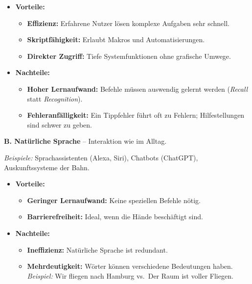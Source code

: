 \documentclass[12pt, a4paper]{article}
\begin{document}
\begin{itemize}
  \item \textbf{Vorteile:}
    \begin{itemize}
      \item \textbf{Effizienz:} Erfahrene Nutzer lösen komplexe Aufgaben sehr schnell.
      \item \textbf{Skriptfähigkeit:} Erlaubt Makros und Automatisierungen.
      \item \textbf{Direkter Zugriff:} Tiefe Systemfunktionen ohne grafische Umwege.
    \end{itemize}
  \item \textbf{Nachteile:}
    \begin{itemize}
      \item \textbf{Hoher Lernaufwand:} Befehle müssen auswendig gelernt werden
            (\textit{Recall} statt \textit{Recognition}).
      \item \textbf{Fehleranfälligkeit:} Ein Tippfehler führt oft zu Fehlern;
            Hilfestellungen sind schwer zu geben.
    \end{itemize}
\end{itemize}

\textbf{B. Natürliche Sprache} -- Interaktion wie im Alltag.

\textit{Beispiele:} Sprachassistenten (Alexa, Siri), Chatbots (ChatGPT),
Auskunftssysteme der Bahn.

\begin{itemize}
  \item \textbf{Vorteile:}
    \begin{itemize}
      \item \textbf{Geringer Lernaufwand:} Keine speziellen Befehle nötig.
      \item \textbf{Barrierefreiheit:} Ideal, wenn die Hände beschäftigt sind.
    \end{itemize}
  \item \textbf{Nachteile:}
    \begin{itemize}
      \item \textbf{Ineffizienz:} Natürliche Sprache ist redundant.
      \item \textbf{Mehrdeutigkeit:} Wörter können verschiedene Bedeutungen haben.\\
            \textit{Beispiel:} \glqq{}Wir fliegen nach Hamburg\grqq{} vs.\
            \glqq{}Der Raum ist voller Fliegen\grqq{}.
    \end{itemize}
\end{itemize}
\end{document}
